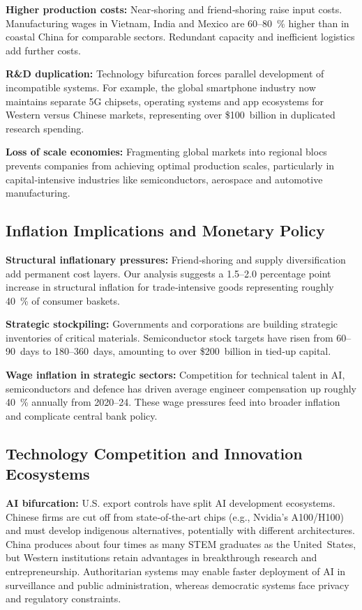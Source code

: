 \documentclass[12pt]{article}
\begin{document}
\textbf{Higher production costs:}  Near‑shoring and friend‑shoring raise input costs.  Manufacturing wages in Vietnam, India and Mexico are 60–80 \% higher than in coastal China for comparable sectors.  Redundant capacity and inefficient logistics add further costs.

\textbf{R\&D duplication:}  Technology bifurcation forces parallel development of incompatible systems.  For example, the global smartphone industry now maintains separate 5G chipsets, operating systems and app ecosystems for Western versus Chinese markets, representing over \$100 billion in duplicated research spending.

\textbf{Loss of scale economies:}  Fragmenting global markets into regional blocs prevents companies from achieving optimal production scales, particularly in capital‑intensive industries like semiconductors, aerospace and automotive manufacturing.

\subsection{Inflation Implications and Monetary Policy}

\textbf{Structural inflationary pressures:}  Friend‑shoring and supply diversification add permanent cost layers.  Our analysis suggests a 1.5–2.0 percentage point increase in structural inflation for trade‑intensive goods representing roughly 40 \% of consumer baskets.

\textbf{Strategic stockpiling:}  Governments and corporations are building strategic inventories of critical materials.  Semiconductor stock targets have risen from 60–90 days to 180–360 days, amounting to over \$200 billion in tied‑up capital.

\textbf{Wage inflation in strategic sectors:}  Competition for technical talent in AI, semiconductors and defence has driven average engineer compensation up roughly 40 \% annually from 2020–24.  These wage pressures feed into broader inflation and complicate central bank policy.

\subsection{Technology Competition and Innovation Ecosystems}

\textbf{AI bifurcation:}  U.S. export controls have split AI development ecosystems.  Chinese firms are cut off from state‑of‑the‑art chips (e.g., Nvidia’s A100/H100) and must develop indigenous alternatives, potentially with different architectures.  China produces about four times as many STEM graduates as the United States, but Western institutions retain advantages in breakthrough research and entrepreneurship.  Authoritarian systems may enable faster deployment of AI in surveillance and public administration, whereas democratic systems face privacy and regulatory constraints.
\end{document}

